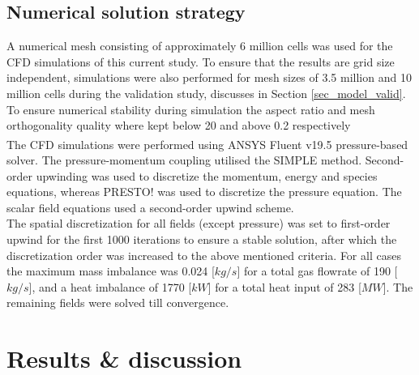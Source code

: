 \documentclass[11pt,cleanfoot]{asme2ej}
\begin{document}
\subsection{Numerical solution strategy}\label{sec_num_sol}
A numerical mesh consisting of approximately 6 million cells was used for the CFD simulations of this current study. To ensure that the results are grid size independent, simulations were also performed for mesh sizes of 3.5 million and 10 million cells during the validation study, discusses in Section \ref{sec_model_valid}. To ensure numerical stability during simulation the aspect ratio and mesh orthogonality quality where kept below 20 and above 0.2 respectively\\ %
The CFD simulations were performed using ANSYS Fluent v19.5\textsuperscript{\textregistered} pressure-based solver. The pressure-momentum coupling utilised the SIMPLE method. Second-order upwinding was used to discretize the momentum, energy and species equations, whereas PRESTO! was used to discretize the pressure equation. The scalar field equations used a second-order upwind scheme.\\
The spatial discretization for all fields (except pressure) was set to first-order upwind for the first 1000 iterations to ensure a stable solution, after which the discretization order was increased to the above mentioned criteria. For all cases the maximum mass imbalance was 0.024 [$kg/s$] for a total gas flowrate of 190 [$kg/s$], and a heat imbalance of 1770 [$kW$] for a total heat input of 283 [$MW$]. The remaining fields were solved till convergence.
\section{Results \& discussion}
\end{document}
